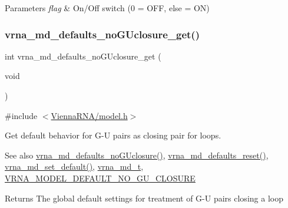 \begin{DoxyParams}{Parameters}
{\em flag} & On/\+Off switch (0 = O\+FF, else = ON) \\
\hline
\end{DoxyParams}
\mbox{\label{group__model__details_ga4f7fdad083243a5348d63320ddaa70f3}} 
\subsubsection{\texorpdfstring{vrna\_md\_defaults\_noGUclosure\_get()}{vrna\_md\_defaults\_noGUclosure\_get()}}
{\footnotesize\ttfamily int vrna\+\_\+md\+\_\+defaults\+\_\+no\+G\+Uclosure\+\_\+get (\begin{DoxyParamCaption}\item[{void}]{ }\end{DoxyParamCaption})}



{\ttfamily \#include $<$\mbox{\hyperlink{model_8h}{Vienna\+R\+N\+A/model.\+h}}$>$}



Get default behavior for G-\/U pairs as closing pair for loops. 

\begin{DoxySeeAlso}{See also}
\mbox{\hyperlink{group__model__details_gade5b9951d71ca2fb357a4e6c0c18ccd1}{vrna\+\_\+md\+\_\+defaults\+\_\+no\+G\+Uclosure()}}, \mbox{\hyperlink{group__model__details_ga70834424cf804d149937de89f80ceb45}{vrna\+\_\+md\+\_\+defaults\+\_\+reset()}}, \mbox{\hyperlink{group__model__details_ga8ac6ff84936282436f822644bf841f66}{vrna\+\_\+md\+\_\+set\+\_\+default()}}, \mbox{\hyperlink{group__model__details_ga1f8a10e12a0a1915f2a4eff0b28ea17c}{vrna\+\_\+md\+\_\+t}}, \mbox{\hyperlink{group__model__details_ga5308de46faaca4b9fd16045864901ee7}{V\+R\+N\+A\+\_\+\+M\+O\+D\+E\+L\+\_\+\+D\+E\+F\+A\+U\+L\+T\+\_\+\+N\+O\+\_\+\+G\+U\+\_\+\+C\+L\+O\+S\+U\+RE}} 
\end{DoxySeeAlso}
\begin{DoxyReturn}{Returns}
The global default settings for treatment of G-\/U pairs closing a loop 
\end{DoxyReturn}
\mbox{\label{group__model__details_ga3de50a73455d88c3957386933b8e1f90}} 
